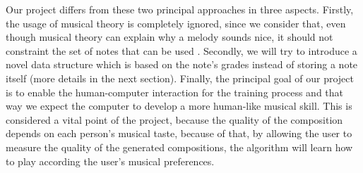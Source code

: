 Our project differs from these two principal approaches in three aspects. Firstly, the usage of musical theory is completely ignored, since we consider that, even though musical theory can explain why a melody sounds nice, it should not constraint the set of notes that can be used \cite{vilchez2015genetic} \cite{biles2013lessons}. Secondly, we will try to introduce a novel data structure which is based on the note's grades instead of storing a note itself (more details in the next section). Finally, the principal goal of our project is to enable the human-computer interaction for the training process and that way we expect the computer to develop a more human-like musical skill. This is considered a vital point of the project, because the quality of the composition depends on each person's musical taste, because of that, by allowing the user to measure the quality of the generated compositions, the algorithm will learn how to play according the user's musical preferences.